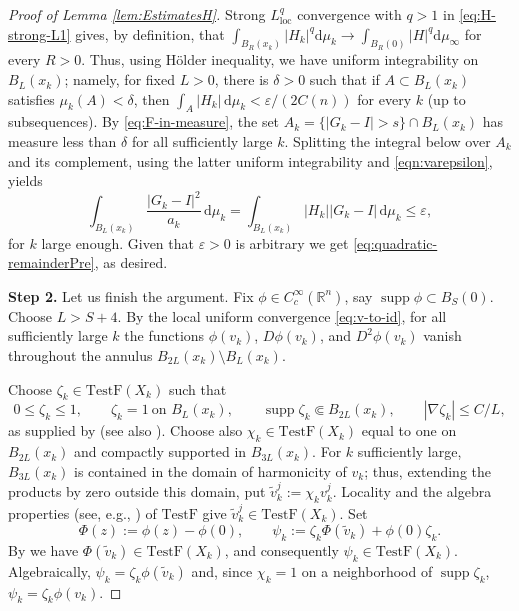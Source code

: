 \documentclass[12pt,a4paper,reqno]{amsart}
\renewcommand{\leq}{\leqslant}
\renewcommand{\epsilon}{\varepsilon}
\newcommand{\TestF}{\mathrm{TestF}}
\newcommand{\supp}{\operatorname{supp}}
\begin{document}
\begin{proof}[Proof of Lemma \ref{lem:EstimatesH}]
Strong $L^q_{\mathrm{loc}}$ convergence with $q>1$ in \eqref{eq:H-strong-L1} gives, by definition, that $\int_{B_R(x_k)}|H_k|^q\mathrm{d}\mu_k \to \int_{B_R(0)}|H|^q\mathrm{d}\mu_\infty$ for every $R>0$.  Thus, using H\"older inequality, we have uniform integrability on $B_L(x_k)$; namely, for fixed $L>0$, there is $\delta>0$ such that if $A\subset B_L(x_k)$ satisfies
$\mu_k(A)<\delta$, then
$\int_A|H_k|\,\mathrm{d}\mu_k<\epsilon/(2C(n))$ for every $k$ (up to subsequences).  By
\eqref{eq:F-in-measure}, the set $A_k=\{|G_k-I|>s\}\cap B_L(x_k)$ has measure less
than $\delta$ for all sufficiently large $k$.  Splitting the integral below
over $A_k$ and its complement, using the latter uniform integrability and \eqref{eqn:varepsilon}, yields
\begin{equation}\label{eq:quadratic-remainder}
 \int_{B_L(x_k)}\frac{|G_k-I|^2}{a_k}\,\mathrm{d}\mu_k
 =\int_{B_L(x_k)}|H_k||G_k-I|\,\mathrm{d}\mu_k
 \leq\epsilon,
\end{equation}
for $k$ large enough. Given that $\epsilon>0$ is arbitrary we get \eqref{eq:quadratic-remainderPre}, as desired.
\medskip

\textbf{Step 2.} Let us finish the argument. Fix $\phi\in C_c^\infty(\mathbb R^n)$, say
$\supp\phi\subset B_S(0)$.  Choose $L>S+4$.  By the local uniform convergence \eqref{eq:v-to-id}, for all sufficiently large $k$ the
functions $\phi(v_k)$, $D\phi(v_k)$, and $D^2\phi(v_k)$ vanish throughout
the annulus $
 B_{2L}(x_k)\setminus B_L(x_k)$.

Choose $\zeta_k\in\TestF(X_k)$ such that
\[
 0\leq\zeta_k\leq1,\qquad
 \zeta_k=1\ \text{on }B_L(x_k),\qquad
 \supp\zeta_k\Subset B_{2L}(x_k),\qquad
 |\nabla\zeta_k|\leq C/L,
\]
as supplied by \cite[Proposition~2.13]{GigliViolo} (see also \cite[Lemma 3.1]{MondinoNaber}).  Choose also
$\chi_k\in\TestF(X_k)$ equal to one on $B_{2L}(x_k)$ and compactly
supported in $B_{3L}(x_k)$.  For $k$ sufficiently large,
$B_{3L}(x_k)$ is contained in the domain of harmonicity of $v_k$; thus,
extending the products by zero outside this domain, put $
 \widetilde v_k^j:=\chi_kv_k^j$.
Locality and the algebra properties (see, e.g., \cite[Equation (2.19)]{GigliViolo}) of $\TestF$ give
$\widetilde v_k^j\in\TestF(X_k)$.  Set
\[
 \Phi(z):=\phi(z)-\phi(0),\qquad
 \psi_k:=\zeta_k\Phi(\widetilde v_k)+\phi(0)\zeta_k.
\]
By
\cite[Lemma~3.1.4]{GigliNDG} we have
$\Phi(\widetilde v_k)\in\TestF(X_k)$, and consequently
$\psi_k\in\TestF(X_k)$.  Algebraically, $
 \psi_k=\zeta_k\phi(\widetilde v_k)$
and, since $\chi_k=1$ on a neighborhood of $\supp\zeta_k$, $
 \psi_k=\zeta_k\phi(v_k)$.
 

\end{proof}
\end{document}
